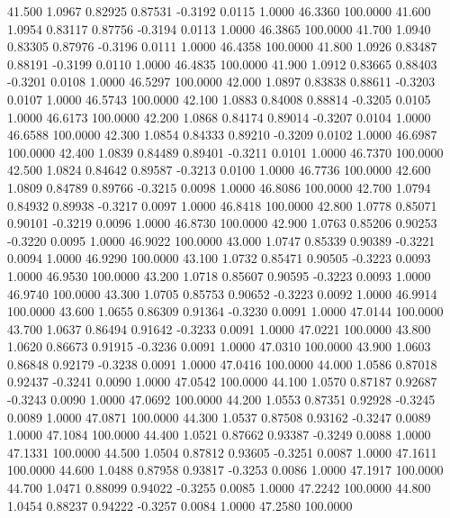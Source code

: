   41.500   1.0967   0.82925   0.87531  -0.3192   0.0115   1.0000  46.3360 100.0000
  41.600   1.0954   0.83117   0.87756  -0.3194   0.0113   1.0000  46.3865 100.0000
  41.700   1.0940   0.83305   0.87976  -0.3196   0.0111   1.0000  46.4358 100.0000
  41.800   1.0926   0.83487   0.88191  -0.3199   0.0110   1.0000  46.4835 100.0000
  41.900   1.0912   0.83665   0.88403  -0.3201   0.0108   1.0000  46.5297 100.0000
  42.000   1.0897   0.83838   0.88611  -0.3203   0.0107   1.0000  46.5743 100.0000
  42.100   1.0883   0.84008   0.88814  -0.3205   0.0105   1.0000  46.6173 100.0000
  42.200   1.0868   0.84174   0.89014  -0.3207   0.0104   1.0000  46.6588 100.0000
  42.300   1.0854   0.84333   0.89210  -0.3209   0.0102   1.0000  46.6987 100.0000
  42.400   1.0839   0.84489   0.89401  -0.3211   0.0101   1.0000  46.7370 100.0000
  42.500   1.0824   0.84642   0.89587  -0.3213   0.0100   1.0000  46.7736 100.0000
  42.600   1.0809   0.84789   0.89766  -0.3215   0.0098   1.0000  46.8086 100.0000
  42.700   1.0794   0.84932   0.89938  -0.3217   0.0097   1.0000  46.8418 100.0000
  42.800   1.0778   0.85071   0.90101  -0.3219   0.0096   1.0000  46.8730 100.0000
  42.900   1.0763   0.85206   0.90253  -0.3220   0.0095   1.0000  46.9022 100.0000
  43.000   1.0747   0.85339   0.90389  -0.3221   0.0094   1.0000  46.9290 100.0000
  43.100   1.0732   0.85471   0.90505  -0.3223   0.0093   1.0000  46.9530 100.0000
  43.200   1.0718   0.85607   0.90595  -0.3223   0.0093   1.0000  46.9740 100.0000
  43.300   1.0705   0.85753   0.90652  -0.3223   0.0092   1.0000  46.9914 100.0000
  43.600   1.0655   0.86309   0.91364  -0.3230   0.0091   1.0000  47.0144 100.0000
  43.700   1.0637   0.86494   0.91642  -0.3233   0.0091   1.0000  47.0221 100.0000
  43.800   1.0620   0.86673   0.91915  -0.3236   0.0091   1.0000  47.0310 100.0000
  43.900   1.0603   0.86848   0.92179  -0.3238   0.0091   1.0000  47.0416 100.0000
  44.000   1.0586   0.87018   0.92437  -0.3241   0.0090   1.0000  47.0542 100.0000
  44.100   1.0570   0.87187   0.92687  -0.3243   0.0090   1.0000  47.0692 100.0000
  44.200   1.0553   0.87351   0.92928  -0.3245   0.0089   1.0000  47.0871 100.0000
  44.300   1.0537   0.87508   0.93162  -0.3247   0.0089   1.0000  47.1084 100.0000
  44.400   1.0521   0.87662   0.93387  -0.3249   0.0088   1.0000  47.1331 100.0000
  44.500   1.0504   0.87812   0.93605  -0.3251   0.0087   1.0000  47.1611 100.0000
  44.600   1.0488   0.87958   0.93817  -0.3253   0.0086   1.0000  47.1917 100.0000
  44.700   1.0471   0.88099   0.94022  -0.3255   0.0085   1.0000  47.2242 100.0000
  44.800   1.0454   0.88237   0.94222  -0.3257   0.0084   1.0000  47.2580 100.0000
